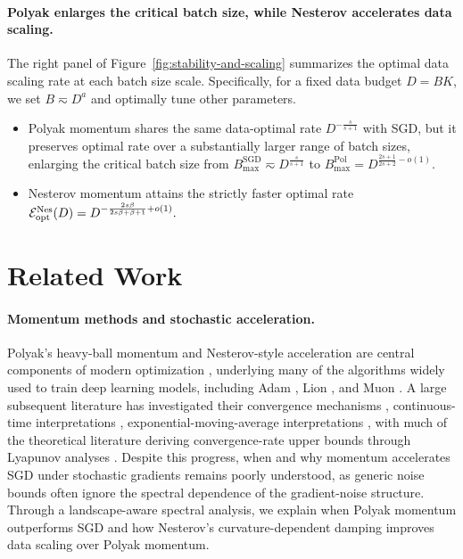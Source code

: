 \documentclass[11pt]{article}
\begin{document}
\paragraph{Polyak enlarges the critical batch size, while Nesterov accelerates data scaling.}
The right panel of Figure~\ref{fig:stability-and-scaling} summarizes the optimal data scaling rate at each batch size scale. Specifically, for a fixed data budget \(D=BK\), we set \(B\eqsim D^a\) and optimally tune other parameters. 
\begin{itemize}
    \item Polyak momentum shares the same data-optimal rate \(D^{-\frac{s}{s+1}}\) with SGD, but it preserves optimal rate over a substantially larger range of batch sizes, enlarging the critical batch size from \(B_{\max}^{\mathrm{SGD}}\eqsim D^{\frac{s}{s+1}}\) to \(B_{\max}^{\mathrm{Pol}}=D^{\frac{2s+1}{2s+2}-o(1)}.\)
    \item Nesterov momentum attains the strictly faster optimal rate \(\mathcal{E}_{\mathrm{opt}}^{\mathrm{Nes}}(D)=D^{-\frac{2s\beta}{2s\beta+\beta+1}+o(1)}.\)
\end{itemize} 


\section{Related Work}

\paragraph{Momentum methods and stochastic acceleration.}
Polyak's heavy-ball momentum \citep{polyak1964some} and Nesterov-style acceleration \citep{nesterov1983method} are central components of modern optimization \citep{gitman2019understanding,fu2023when,wang2024marginal}, underlying many of the algorithms widely used to train deep learning models, including Adam \citep{kingma2015adam}, Lion \citep{chen2023symbolic}, and Muon \citep{liu2025muon}. A large subsequent literature has investigated their convergence mechanisms \citep{vidyasagar2025convergence,velikanov2023view,liu2020improved,zhang2024optimalityacceleratedsgdhighdimensional,ferbach2025dimensionadaptedmomentumoutscalessgd, yarotsky2025corner}, continuous-time interpretations \citep{su2016differential,wibisono2016variational,shi2022understanding,wilson2021lyapunov,kovachki2021continuous}, exponential-moving-average interpretations \citep{gitman2019understanding,velikanov2023view,li2025understandingema,busbridge2023scaleema}, with much of the theoretical literature deriving convergence-rate upper bounds through Lyapunov analyses \citep{su2016differential,liu2019acceleratingsgdmomentumoverparameterized,gupta2024nesterov}. Despite this progress, when and why momentum accelerates SGD under stochastic gradients remains poorly understood\citep{wang2024marginal,yuan2016influence,gupta2024nesterov}, as generic noise bounds often ignore the spectral dependence of the gradient-noise structure. Through a landscape-aware spectral analysis, we explain when Polyak momentum outperforms SGD and how Nesterov’s
curvature-dependent damping improves data scaling over Polyak momentum.
\end{document}
